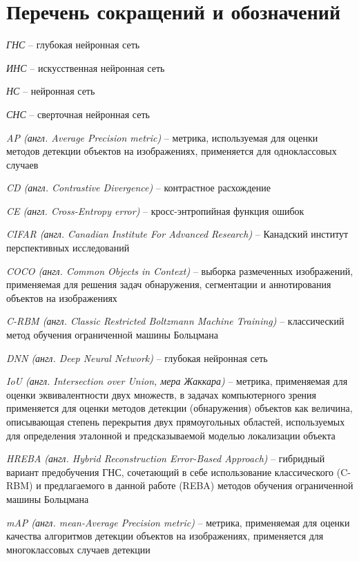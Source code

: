 \chapter*{Перечень сокращений и обозначений}

\textit{ГНС} -- глубокая нейронная сеть

\textit{ИНС} -- искусственная нейронная сеть

\textit{НС} -- нейронная сеть

\textit{СНС} -- сверточная нейронная сеть

\textit{AP (англ. Average Precision metric)} -- метрика, используемая для оценки методов детекции объектов на изображениях, применяется для одноклассовых случаев

\textit{CD (англ. Contrastive Divergence)} -- контрастное расхождение

\textit{CE (англ. Cross-Entropy error)} -- кросс-энтропийная функция ошибок

\textit{CIFAR (англ. Canadian Institute For Advanced Research)} -- Канадский институт перспективных исследований

\textit{COCO (англ. Common Objects in Context)} -- выборка размеченных изображений, применяемая для решения задач обнаружения, сегментации и аннотирования объектов на изображениях

\textit{C-RBM (англ. Classic Restricted Boltzmann Machine Training)} -- классический метод обучения ограниченной машины Больцмана

\textit{DNN (англ. Deep Neural Network)} -- глубокая нейронная сеть

\textit{IoU (англ. Intersection over Union, мера Жаккара)} -- метрика, применяемая для оценки эквивалентности двух множеств, в задачах компьютерного зрения применяется для оценки методов детекции (обнаружения) объектов как величина, описывающая степень перекрытия двух прямоугольных областей, используемых для определения эталонной и предсказываемой моделью локализации объекта 

\textit{HREBA (англ. Hybrid Reconstruction Error-Based Approach)} -- гибридный вариант предобучения ГНС, сочетающий в себе использование классического (C-RBM) и предлагаемого в данной работе (REBA) методов обучения ограниченной машины Больцмана

\textit{mAP (англ. mean-Average Precision metric)} -- метрика, применяемая для оценки качества алгоритмов детекции объектов на изображениях, применяется для многоклассовых случаев детекции

